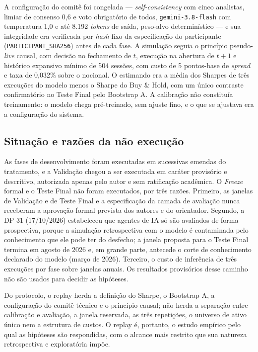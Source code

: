 \documentclass{eic-bcc-tcc}
\begin{document}
A configuração do comitê foi congelada --- \textit{self-consistency} com cinco analistas, limiar de consenso 0,6 e voto obrigatório de todos, \texttt{gemini-3.8-flash} com temperatura 1,0 e até 8.192 \textit{tokens} de saída, peso-alvo determinístico --- e sua integridade era verificada por \textit{hash} fixo da especificação do participante (\texttt{PARTICIPANT\_SHA256}) antes de cada fase. A simulação seguia o princípio pseudo-\textit{live} causal, com decisão no fechamento de $t$, execução na abertura de $t+1$ e histórico expansivo mínimo de 504 sessões, com custo de 5 pontos-base de \textit{spread} e taxa de 0,032\% sobre o nocional. O estimando era a média dos Sharpes de três execuções do modelo menos o Sharpe do Buy \& Hold, com um único contraste confirmatório no Teste Final pelo Bootstrap A. A calibração não constituía treinamento: o modelo chega pré-treinado, sem ajuste fino, e o que se ajustava era a configuração do sistema.

\subsection{Situação e razões da não execução}

As fases de desenvolvimento foram executadas em sucessivas emendas do tratamento, e a Validação chegou a ser executada em caráter provisório e descritivo, autorizada apenas pelo autor e sem ratificação acadêmica. O \textit{Freeze} formal e o Teste Final não foram executados, por três razões. Primeiro, as janelas de Validação e de Teste Final e a especificação da camada de avaliação nunca receberam a aprovação formal prevista dos autores e do orientador. Segundo, a DP-31 (17/10/2026) estabeleceu que agentes de IA só são avaliados de forma prospectiva, porque a simulação retrospectiva com o modelo é contaminada pelo conhecimento que ele pode ter do desfecho; a janela proposta para o Teste Final termina em agosto de 2026 e, em grande parte, antecede o corte de conhecimento declarado do modelo (março de 2026). Terceiro, o custo de inferência de três execuções por fase sobre janelas anuais. Os resultados provisórios desse caminho não são usados para decidir as hipóteses.

Do protocolo, o replay herda a definição do Sharpe, o Bootstrap A, a configuração do comitê técnico e o princípio causal; não herda a separação entre calibração e avaliação, a janela reservada, as três repetições, o universo de ativo único nem a estrutura de custos. O replay é, portanto, o estudo empírico pelo qual as hipóteses são respondidas, com o alcance mais restrito que sua natureza retrospectiva e exploratória impõe.
\end{document}
